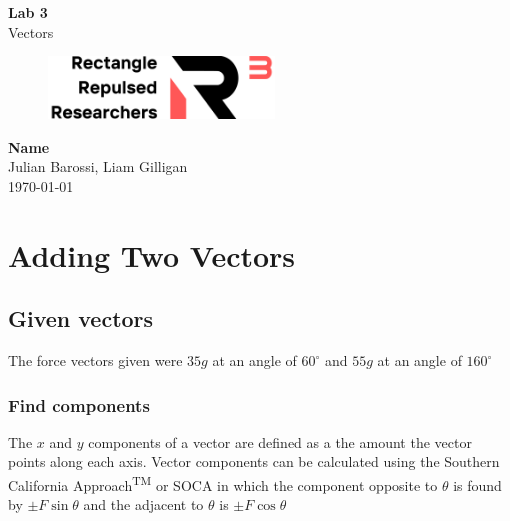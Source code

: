 \documentclass[11pt, letterpaper, includehead]{article}
\begin{document}
\begin{titlepage}
  \begin{center}
    \Huge{\textbf{Lab 3}}\\
    \Huge{Vectors}
    \vfill
    \begin{figure}[H] %
      \centering
      \includegraphics[width=6cm]{../logo.png}
    \end{figure}
    \Large{\textbf{Name}}\\
      \vspace{0.25cm}
      \large{Julian Barossi, Liam Gilligan}\\
      \vspace{0.25cm}
      \normalsize
      \today
  \end{center}
\end{titlepage}

\tableofcontents
\pagebreak %

\pagestyle{fancy}
\fancyhead{}

\pagebreak 

\section{Adding Two Vectors} %

\subsection{Given vectors} %
The force vectors given were $35g$ at an angle of $60^{\circ}$ and $55g$ at an angle of $160^{\circ}$

\subsubsection{Find components} %
The $x$ and $y$ components of a vector are defined as a the amount the vector 
points along each axis. Vector components can be calculated using the Southern 
California Approach\textsuperscript{TM} or SOCA in which the component opposite to
$\theta$ is found by $\pm F \sin\theta$ and the adjacent to $\theta$ is $\pm F \cos\theta$
\end{document}
